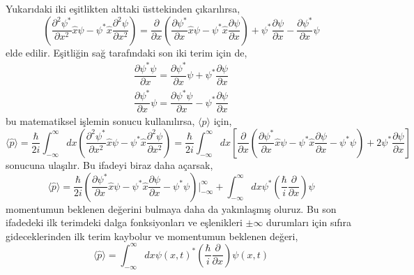 \documentclass[00_kitap.tex]{subfiles}
\begin{document}
Yukarıdaki iki eşitlikten alttaki üsttekinden çıkarılırsa,
\begin{equation*}
\left( \dfrac {\partial ^{2}\psi ^{\ast }}{\partial x^{2}}\hat x\psi -\psi ^{\ast }\hat x\dfrac {\partial ^{2}\psi }{\partial x^{2}}\right) = \dfrac {\partial }{\partial x}\left( \dfrac {\partial \psi ^{\ast }}{\partial x}\hat x\psi -\psi ^{\ast } \hat x\dfrac {\partial \psi }{\partial x}\right) +\psi ^{\ast }\dfrac {\partial \psi }{\partial x}-\dfrac {\partial \psi ^{\ast }}{\partial x}\psi 
\end{equation*}
elde edilir. Eşitliğin sağ tarafındaki son iki terim için de,
\begin{align*}
\dfrac {\partial \psi ^{\ast }\psi }{\partial x}=\dfrac {\partial \psi ^{\ast }}{\partial x}\psi +\psi ^{\ast }\dfrac {\partial \psi }{\partial x}\\
\dfrac {\partial \psi ^{\ast }}{\partial x}\psi =\dfrac {\partial \psi ^{\ast }\psi }{\partial x}-\psi ^{\ast }\dfrac {\partial \psi }{\partial x}
\end{align*}
bu matematiksel işlemin sonucu kullanılırsa, $\langle p \rangle$ için,
\begin{equation*}
\langle \hat p\rangle =\dfrac {\hbar }{2i}\int ^{\infty }_{-\infty }dx\left( \dfrac {\partial ^{2}\psi ^{\ast }}{\partial x^{2}} \hat x\psi -\psi ^{\ast } \hat x\dfrac {\partial ^{2}\psi }{\partial x^{2}}\right) =  \dfrac {\hbar }{2i}\int ^{\infty }_{-\infty }dx \left[\dfrac {\partial }{\partial x}\left( \dfrac {\partial \psi ^{\ast }}{\partial x} \hat x\psi -\psi ^{\ast } \hat x\dfrac {\partial \psi }{\partial x} - \psi^\ast \psi\right) +2\psi ^{\ast }\dfrac {\partial \psi }{\partial x}\right]
\end{equation*}
sonucuna ulaşılır. Bu ifadeyi biraz daha açarsak,
\begin{equation*}
\langle \hat p\rangle = \dfrac {\hbar }{2i}\left( \dfrac {\partial \psi ^{\ast }}{\partial x}\hat x\psi -\psi ^{\ast } \hat x\dfrac {\partial \psi }{\partial x} - \psi^\ast \psi \right){\bigg |}_{-\infty}^{\infty} + \int ^{\infty }_{-\infty }dx \psi ^{\ast }\left(\dfrac {\hbar }{i}\dfrac {\partial}{\partial x}\right) \psi
\end{equation*}
momentumun beklenen değerini bulmaya daha da yakınlaşmış oluruz. Bu son ifadedeki ilk terimdeki dalga fonksiyonları ve eşlenikleri $\pm\infty$ durumları için sıfıra gideceklerinden ilk terim kaybolur ve momentumun beklenen değeri,
\begin{equation}
\langle \hat p\rangle =  \int ^{\infty }_{-\infty }dx \psi(x,t) ^{\ast }\left(\dfrac {\hbar }{i}\dfrac {\partial}{\partial x}\right) \psi(x,t)
\label{eq:expactation_value_and_op_momentum}
\end{equation}
\end{document}
